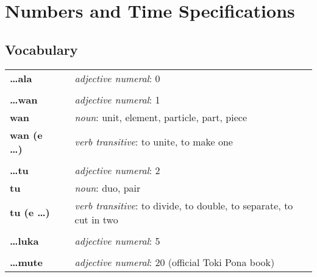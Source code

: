 
\section{Numbers and Time Specifications}
\subsection*{Vocabulary}

\begin{supertabular}{p{2,5cm}|ll}
    \textbf{\dots ala}       &  & \textit{adjective numeral}: 0                                                    \\
                             &  &                                                                                  \\
    \textbf{\dots wan}       &  & \textit{adjective numeral}: 1                                                    \\
    \textbf{wan}             &  & \textit{noun}: unit, element, particle, part, piece                              \\
    \textbf{wan (e \dots)}   &  & \textit{verb transitive}: to unite, to make one                                  \\
                             &  &                                                                                  \\
    \textbf{\dots tu}        &  & \textit{adjective numeral}: 2                                                    \\
    \textbf{tu}              &  & \textit{noun}: duo, pair                                                         \\
    \textbf{tu (e \dots)}    &  & \textit{verb transitive}: to divide, to double, to separate, to cut in two       \\
                             &  &                                                                                  \\
    \textbf{\dots luka}      &  & \textit{adjective numeral}: 5                                                    \\
                             &  &                                                                                  \\
    \textbf{\dots mute}      &  & \textit{adjective numeral}: 20 (official Toki Pona book)                         \\

\end{supertabular}
